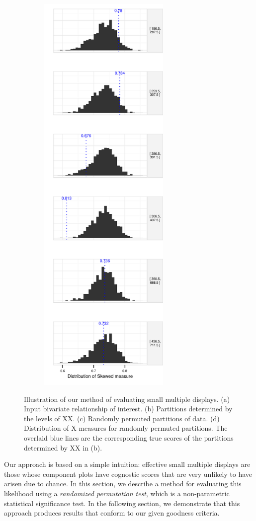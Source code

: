 \begin{figure}
\begin{subfigure}[t]{2.5in}
 	\includegraphics[width=2.5in]{images/hist-TAX.pdf}
	\caption{}
	 \label{fig:method_dist}
     \end{subfigure}
   \caption{Illustration of our method of evaluating small multiple displays. (a) Input bivariate relationship of interest. (b) Partitions determined by the levels of XX. (c) Randomly permuted partitions of data. (d) Distribution of X measures for randomly permuted partitions. The overlaid blue lines are the corresponding true scores of the partitions determined by XX in (b).}
\end{figure}

Our approach is based on a simple intuition: effective small multiple displays are those whose component plots have cognostic scores that are very unlikely to have arisen due to chance. In this section, we describe a method for evaluating this likelihood using a \emph{randomized permutation test}, which is a non-parametric statistical significance test. In the following section, we demonstrate that this approach produces results that conform to our given goodness criteria.

